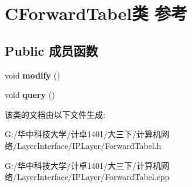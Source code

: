 \hypertarget{class_c_forward_tabel}{}\section{C\+Forward\+Tabel类 参考}
\label{class_c_forward_tabel}
\subsection*{Public 成员函数}
\begin{DoxyCompactItemize}
\item 
\mbox{\label{class_c_forward_tabel_afbc987ef5b55ab2fbc21721d47d623ad}} 
void {\bfseries modify} ()
\item 
\mbox{\label{class_c_forward_tabel_a90efc1b05feb38559334c371a8e83019}} 
void {\bfseries query} ()
\end{DoxyCompactItemize}


该类的文档由以下文件生成\+:\begin{DoxyCompactItemize}
\item 
G\+:/华中科技大学/计卓1401/大三下/计算机网络/\+Layer\+Interface/\+I\+P\+Layer/Forward\+Tabel.\+h\item 
G\+:/华中科技大学/计卓1401/大三下/计算机网络/\+Layer\+Interface/\+I\+P\+Layer/Forward\+Tabel.\+cpp\end{DoxyCompactItemize}
